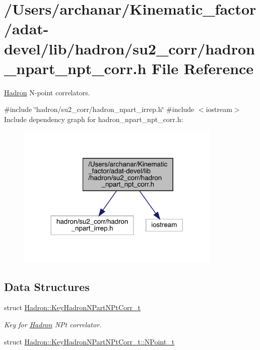 \hypertarget{adat-devel_2lib_2hadron_2su2__corr_2hadron__npart__npt__corr_8h}{}\section{/\+Users/archanar/\+Kinematic\+\_\+factor/adat-\/devel/lib/hadron/su2\+\_\+corr/hadron\+\_\+npart\+\_\+npt\+\_\+corr.h File Reference}
\label{adat-devel_2lib_2hadron_2su2__corr_2hadron__npart__npt__corr_8h}


\mbox{\hyperlink{namespaceHadron}{Hadron}} N-\/point correlators.  


{\ttfamily \#include \char`\"{}hadron/su2\+\_\+corr/hadron\+\_\+npart\+\_\+irrep.\+h\char`\"{}}\newline
{\ttfamily \#include $<$iostream$>$}\newline
Include dependency graph for hadron\+\_\+npart\+\_\+npt\+\_\+corr.\+h\+:
\nopagebreak
\begin{figure}[H]
\begin{center}
\leavevmode
\includegraphics[width=276pt]{d1/db5/adat-devel_2lib_2hadron_2su2__corr_2hadron__npart__npt__corr_8h__incl}
\end{center}
\end{figure}
\subsection*{Data Structures}
\begin{DoxyCompactItemize}
\item 
struct \mbox{\hyperlink{structHadron_1_1KeyHadronNPartNPtCorr__t}{Hadron\+::\+Key\+Hadron\+N\+Part\+N\+Pt\+Corr\+\_\+t}}
\begin{DoxyCompactList}\small\item\em Key for \mbox{\hyperlink{namespaceHadron}{Hadron}} N\+Pt correlator. \end{DoxyCompactList}\item 
struct \mbox{\hyperlink{structHadron_1_1KeyHadronNPartNPtCorr__t_1_1NPoint__t}{Hadron\+::\+Key\+Hadron\+N\+Part\+N\+Pt\+Corr\+\_\+t\+::\+N\+Point\+\_\+t}}
\end{DoxyCompactItemize}
